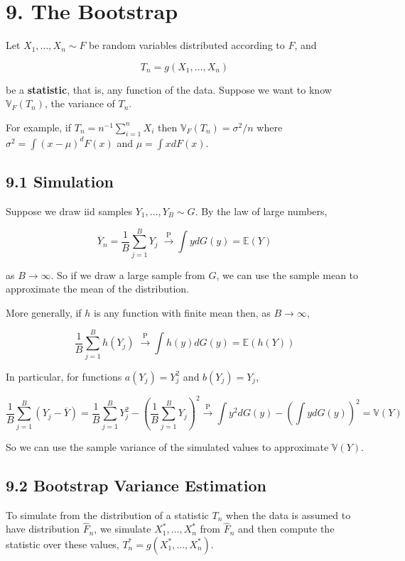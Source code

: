 \section{9. The Bootstrap}\label{the-bootstrap}

Let \(X_1, \dots, X_n \sim F\) be random variables distributed according
to \(F\), and

\[ T_n = g(X_1, \dots, X_n)\]

be a \textbf{statistic}, that is, any function of the data. Suppose we
want to know \(\mathbb{V}_F(T_n)\), the variance of \(T_n\).

For example, if \(T_n = n^{-1}\sum_{i=1}^nX_i\) then
\(\mathbb{V}_F(T_n) = \sigma^2/n\) where
\(\sigma^2 = \int (x - \mu)^dF(x)\) and \(\mu = \int x dF(x)\).

\subsection{9.1 Simulation}\label{simulation}

Suppose we draw iid samples \(Y_1, \dots, Y_B \sim G\). By the law of
large numbers,

\[ \overline{Y}_n = \frac{1}{B} \sum_{j=1}^B Y_j \; \xrightarrow{\text{P}} \int y dG(y) = \mathbb{E}(Y)\]

as \(B \rightarrow \infty\). So if we draw a large sample from \(G\), we
can use the sample mean to approximate the mean of the distribution.

More generally, if \(h\) is any function with finite mean then, as
\(B \rightarrow \infty\),

\[\frac{1}{B} \sum_{j=1}^B h(Y_j) \; \xrightarrow{\text{P}} \int h(y) dG(y) = \mathbb{E}(h(Y))\]

In particular, for functions \(a(Y_j) = Y_j^2\) and \(b(Y_j) = Y_j\),

\[\frac{1}{B} \sum_{j=1}^B (Y_j - \overline{Y}) 
= \frac{1}{B} \sum_{j=1}^B Y_j^2 - \left(\frac{1}{B} \sum_{j=1}^B Y_j \right)^2
\xrightarrow{\text{P}} \int y^2 dG(y) - \left( \int y dG(y) \right)^2 = \mathbb{V}(Y)
\]

So we can use the sample variance of the simulated values to approximate
\(\mathbb{V}(Y)\).

\subsection{9.2 Bootstrap Variance
Estimation}\label{bootstrap-variance-estimation}

To simulate from the distribution of a statistic \(T_n\) when the data
is assumed to have distribution \(\hat{F}_n\), we simulate
\(X_1^*, \dots, X_n^*\) from \(\hat{F}_n\) and then compute the
statistic over these values, \(T_n^* = g(X_1^*, \dots, X_n^*)\).

